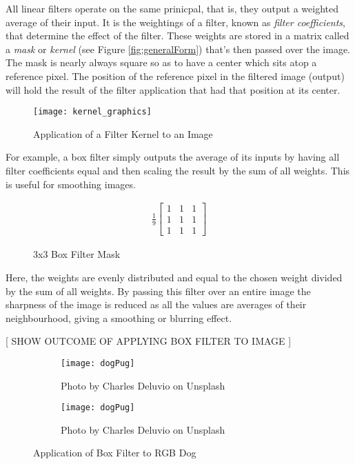 All linear filters operate on the same prinicpal, that is, they output a weighted average of their input. It is the weightings of a filter, known as \emph{filter coefficients}, that determine the effect of the filter. These weights are stored in a matrix called a \emph{mask} or \emph{kernel} (see Figure \ref{fig:generalForm}) that's then passed over the image. The mask is nearly always square so as to have a center which sits atop a reference pixel. The position of the reference pixel in the filtered image (output) will hold the result of the filter application that had that position at its center.

\begin{figure}[H]
  \centering
  \centering\texttt{[image: kernel\_graphics]}
  \caption{Application of a Filter Kernel to an Image}
\end{figure}

For example, a box filter simply outputs the average of its inputs by having all filter coefficients equal and then scaling the result by the sum of all weights. This is useful for smoothing images.

\begin{figure}[H]
  \begin{gather}
    \frac{1}{9}
    \begin{bmatrix}
      1 & 1 & 1 \\
      1 & 1 & 1 \\
      1 & 1 & 1
    \end{bmatrix}
  \end{gather}
  \caption{3x3 Box Filter Mask}
\end{figure}


Here, the weights are evenly distributed and equal to the chosen weight divided by the sum of all weights. By passing this filter over an entire image the sharpness of the image is reduced as all the values are averages of their neighbourhood, giving a smoothing or blurring effect.

[ SHOW OUTCOME OF APPLYING BOX FILTER TO IMAGE  ]

\begin{figure}[ht!]
  \centering
  \begin{subfigure}[b]{0.5\linewidth}
    \centering\texttt{[image: dogPug]}
    \caption{Photo by Charles Deluvio on Unsplash}
    \label{fig:roughDog}
  \end{subfigure}
  \begin{subfigure}[b]{0.5\linewidth}
    \centering\texttt{[image: dogPug]}
    \caption{Photo by Charles Deluvio on Unsplash}
    \label{fig:smoothDog}
  \end{subfigure}
  \caption{Application of Box Filter to RGB Dog}
  \label{fig:dogPug}
\end{figure}

